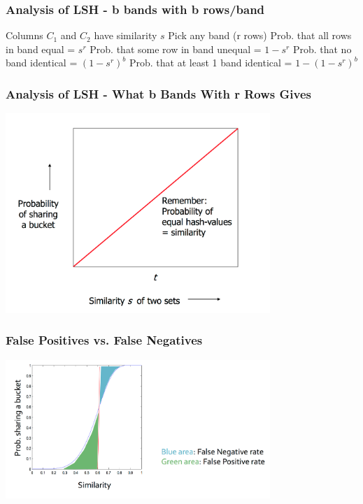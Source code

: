 \documentclass[svgnames]{beamer}
\begin{document}
  
\begin{frame} \frametitle{Analysis of LSH - b bands with b rows/band}

Columns $C_1$ and $C_2$ have similarity $s$
Pick any band (r rows)
  Prob. that all rows in band equal = $s^r$
  Prob. that some row in band unequal = $1 - s^r$
  Prob. that no band identical = $(1 - s^r)^b$
  Prob. that at least 1 band identical = $1 - (1 - s^r)^b$  
\end{frame}

  
\begin{frame} \frametitle{Analysis of LSH - What b Bands With r Rows Gives}

\includegraphics[width=10cm]{what-1-band-gives}

\end{frame}

  
\begin{frame} \frametitle{False Positives vs. False Negatives}

\includegraphics[width=10cm]{tradeoff}

\end{frame}

  
\end{document}
